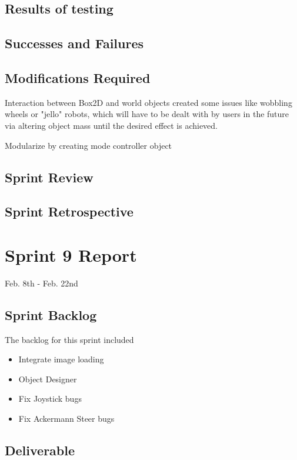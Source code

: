 \subsection{Results of testing}


\subsection{Successes and Failures}


\subsection{Modifications Required}

Interaction between Box2D and world objects created some issues like wobbling wheels or "jello" robots, which will have to be dealt with by users in the future via altering object mass until the desired effect is achieved.

Modularize by creating mode controller object

\subsection{Sprint Review}


\subsection{Sprint Retrospective}
\section{Sprint 9 Report}
Feb. 8th - Feb. 22nd
\subsection{Sprint Backlog}

The backlog for this sprint included

\begin{itemize}
	\item Integrate image loading
	\item Object Designer	
	\item Fix Joystick bugs
	\item Fix Ackermann Steer bugs
\end{itemize}

\subsection{Deliverable}

